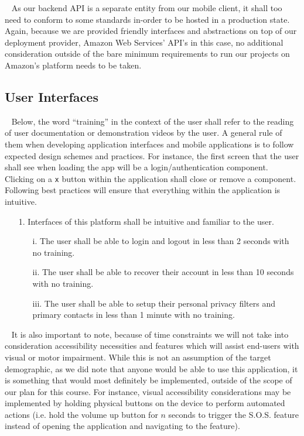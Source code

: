 \documentclass{scrreprt}
\begin{document}
\par ~ As our backend API is a separate entity from our mobile client, it shall too need to conform to some standards in-order to be hosted in a production state. Again, because we are provided friendly interfaces and abstractions on top of our deployment provider, Amazon Web Services' API's in this case, no additional consideration outside of the bare minimum requirements to run our projects on Amazon's platform needs to be taken.

\subsection{User Interfaces}
\par ~ Below, the word ``training'' in the context of the user shall refer to the reading of user documentation or demonstration videos by the user. A general rule of them when developing application interfaces and mobile applications is to follow expected design schemes and practices. For instance, the first screen that the user shall see when loading the app will be a login/authentication component. Clicking on a \texttt{x} button within the application shall close or remove a component. Following best practices will ensure that everything within the application is intuitive.
\begin{enumerate}
	\item[1.] Interfaces of this platform shall be intuitive and familiar to the user.
	\begin{itemize}
		\item[i.] The user shall be able to login and logout in less than 2 seconds with no training.
		\item[ii.] The user shall be able to recover their account in less than 10 seconds with no training.
		\item[iii.] The user shall be able to setup their personal privacy filters and primary contacts in less than 1 minute with no training.
	\end{itemize}
\end{enumerate}
\par ~ It is also important to note, because of time constraints we will not take into consideration accessibility necessities and features which will assist end-users with visual or motor impairment. While this is not an assumption of the target demographic, as we did note that anyone would be able to use this application, it is something that would most definitely be implemented, outside of the scope of our plan for this course. For instance, visual accessibility considerations may be implemented by holding physical buttons on the device to perform automated actions (i.e. hold the volume up button for $n$ seconds to trigger the S.O.S. feature instead of opening the application and navigating to the feature).
\end{document}
